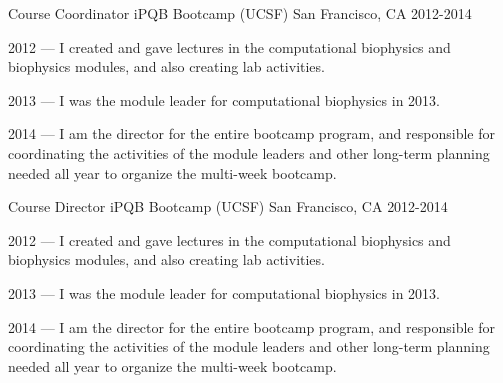 

\begin{cventries}

  \cventry
  {Course Coordinator} %
  {iPQB Bootcamp (UCSF)} %
  {San Francisco, CA} %
  {2012-2014} %
  {
    \begin{cvitems} %
    \item {2012 --- I created and gave lectures in the computational biophysics and biophysics modules, and also creating lab activities.}
    \item {2013 --- I was the module leader for computational biophysics in 2013.}
    \item {2014 --- I am the director for the entire bootcamp program, and responsible for coordinating the activities of the module leaders and other long-term planning needed all year to organize the multi-week bootcamp.}
    \end{cvitems}
  }

  \cventry
  {Course Director} %
  {iPQB Bootcamp (UCSF)} %
  {San Francisco, CA} %
  {2012-2014} %
  {
    \begin{cvitems} %
    \item {2012 --- I created and gave lectures in the computational biophysics and biophysics modules, and also creating lab activities.}
    \item {2013 --- I was the module leader for computational biophysics in 2013.}
    \item {2014 --- I am the director for the entire bootcamp program, and responsible for coordinating the activities of the module leaders and other long-term planning needed all year to organize the multi-week bootcamp.}
    \end{cvitems}
  }


\end{cventries}
